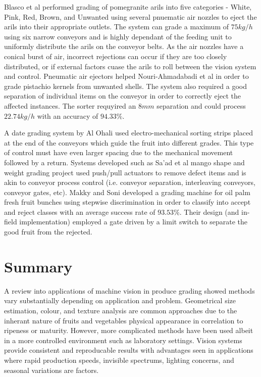 \documentclass[fleqn,twoside,12pt]{report}
\begin{document}
Blasco et al \cite{blasco} performed grading of pomegranite arils into five categories - White, Pink, Red, Brown, and Unwanted using several pnuematic air nozzles to eject the arils into their appropriate outlets. The system can grade a maximum of $75kg/h$ using six narrow conveyors and is highly dependant of the feeding unit to uniformly distribute the arils on the conveyor belts. As the air nozzles have a conical burst of air, incorrect rejections can occur if they are too closely distributed, or if external factors cuase the arils to roll between the vision system and control. Pneumatic air ejectors helped Nouri-Ahmadabadi et al \cite{nouri-ahmadabadi} in order to grade pistachio kernels from unwanted shells. The system also required a good separation of individual items on the conveyor in order to correctly eject the affected instances. The sorter requyired an $8mm$ separation and could process $22.74kg/h$ with an accuracy of $94.33\%$. 

A date grading system by Al Ohali \cite{ohali} used electro-mechanical sorting strips placed at the end of the conveyors which guide the fruit into different grades. This type of control must have even larger spacing due to the mechanical movement followed by a return. Systems developed such as Sa'ad et al \cite{saad} mango shape and weight grading project used push/pull actuators to remove defect items and is akin to conveyor process control (i.e. conveyor separation, interleaving conveyors, conveyor gates, etc). Makky and Soni \cite{makky} developed a grading machine for oil palm fresh fruit bunches using stepwise discrimination in order to classify into accept and reject classes with an average success rate of $93.53\%$. Their design (and in-field implementation) employed a gate driven by a limit switch to separate the good fruit from the rejected.




\section{Summary}


A review into applications of machine vision in produce grading showed methods vary substantially depending on application and problem. Geometrical size estimation, colour, and texture analysis are common approaches due to the inherant nature of fruits and vegetables physical appearance in correlation to ripeness or maturity. However, more complicated methods have been used albeit in a more controlled environment such as laboratory settings. Vision systems provide consistent and reproducable results with advantages seen in applications where rapid production speeds, invisible spectrums, lighting concerns, and seasonal variations are factors.
\end{document}
